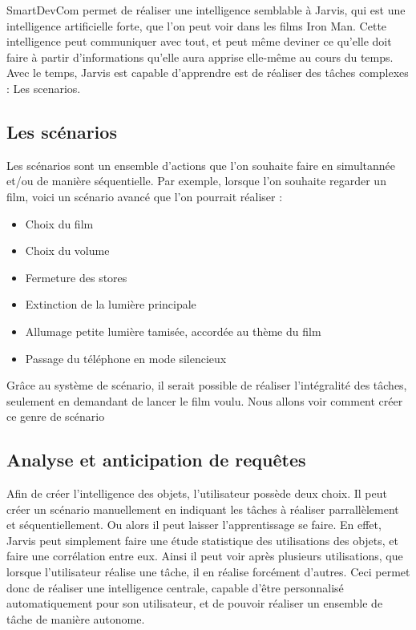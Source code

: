 SmartDevCom permet de réaliser une intelligence semblable à Jarvis, qui est une intelligence artificielle 
forte, que l'on peut voir dans les films Iron Man. Cette intelligence peut communiquer avec tout, et peut 
même deviner ce qu'elle doit faire à partir d'informations qu'elle aura apprise elle-même au cours du temps. 
Avec le temps, Jarvis est capable d'apprendre est de réaliser des tâches complexes : Les scenarios.
	\subsection{Les scénarios}
Les scénarios sont un ensemble d'actions que l'on souhaite faire en simultannée et/ou de manière 
séquentielle. 
Par exemple, lorsque l'on souhaite regarder un film, voici un scénario avancé que l'on pourrait réaliser :
\begin{itemize}
 \item Choix du film
 \item Choix du volume
 \item Fermeture des stores
 \item Extinction de la lumière principale
 \item Allumage petite lumière tamisée, accordée au thème du film
 \item Passage du téléphone en mode silencieux 
\end{itemize}

Grâce au système de scénario, il serait possible de réaliser l'intégralité des tâches, seulement en demandant 
de lancer le film voulu. Nous allons voir comment créer ce genre de scénario
	\subsection{Analyse et anticipation de requêtes}
Afin de créer l'intelligence des objets, l'utilisateur possède deux choix. Il peut créer un scénario 
manuellement en indiquant les tâches à réaliser parrallèlement et séquentiellement. Ou alors il peut laisser 
l'apprentissage se faire. En effet, Jarvis peut simplement faire une étude statistique des utilisations des 
objets, et faire une corrélation entre eux. Ainsi il peut voir après plusieurs utilisations, que 
lorsque l'utilisateur réalise une tâche, il en réalise forcément d'autres. Ceci permet donc de réaliser 
une intelligence centrale, capable d'être personnalisé automatiquement pour son utilisateur, et de pouvoir 
réaliser un ensemble de tâche de manière autonome.

